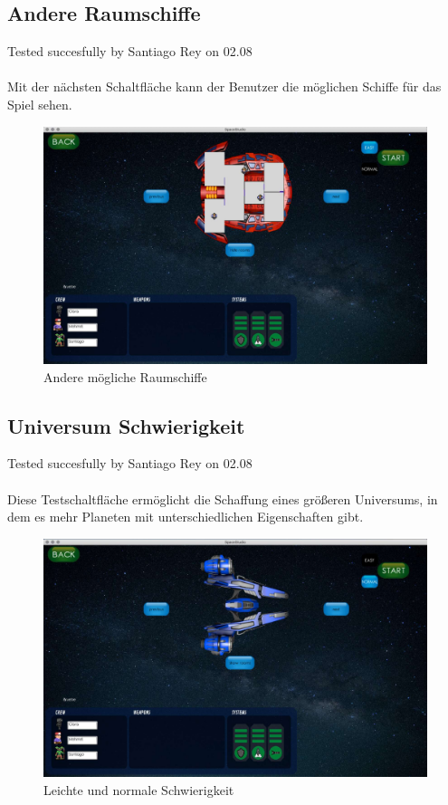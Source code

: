 \documentclass[12pt]{article}
\begin{document}
\newpage

\subsection{Andere Raumschiffe}
Tested succesfully by Santiago Rey on 02.08\\\\
Mit der nächsten Schaltfläche kann der Benutzer die möglichen Schiffe für das Spiel sehen.
\begin{figure}
\centering
\includegraphics[scale=0.4]{TestProtocolBilder/next.jpg}
\caption{Andere mögliche Raumschiffe}
\end{figure}

\newpage
\subsection{Universum Schwierigkeit}
Tested succesfully by Santiago Rey on 02.08\\\\
Diese Testschaltfläche ermöglicht die Schaffung eines größeren Universums, in dem es mehr Planeten mit unterschiedlichen Eigenschaften gibt.\\
\begin{figure}
\centering
\includegraphics[scale=0.4]{TestProtocolBilder/universeButon.jpg}
\caption{Leichte und normale Schwierigkeit}
\end{figure}
\end{document}

